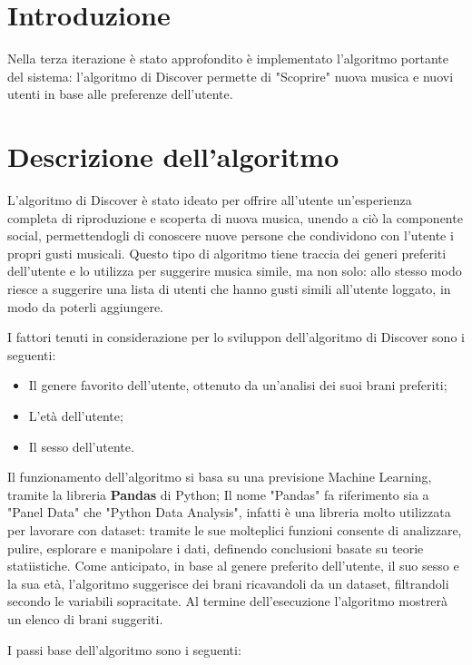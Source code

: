 \section{Introduzione}
Nella terza iterazione è stato approfondito è implementato l'algoritmo portante del sistema: l'algoritmo di Discover permette di "Scoprire" nuova 
musica e nuovi utenti in base alle preferenze dell'utente.


\section{Descrizione dell'algoritmo}
L'algoritmo di Discover è stato ideato per offrire all'utente un'esperienza completa di riproduzione e scoperta di nuova musica, unendo a ciò la 
componente social, permettendogli di conoscere nuove persone che condividono con l'utente i propri gusti musicali. Questo tipo di algoritmo 
tiene traccia dei generi preferiti dell'utente e lo utilizza per suggerire musica simile, ma non solo: allo stesso modo riesce a suggerire 
una lista di utenti che hanno gusti simili all'utente loggato, in modo da poterli aggiungere.  

I fattori tenuti in considerazione per lo sviluppon dell'algoritmo di Discover sono i seguenti: 
\begin{itemize}
    \item Il genere favorito dell'utente, ottenuto da un'analisi dei suoi brani preferiti;
    \item L'età dell'utente;
    \item Il sesso dell'utente.
\end{itemize}


Il funzionamento dell'algoritmo si basa su una previsione Machine Learning, tramite la libreria \textbf{Pandas} di Python;
Il nome "Pandas" fa riferimento sia a "Panel Data" che "Python Data Analysis", infatti è una libreria molto utilizzata per lavorare 
con dataset: tramite le sue molteplici funzioni consente di analizzare, pulire, esplorare e manipolare i dati, definendo 
conclusioni basate su teorie statiistiche. 
Come anticipato, in base al genere preferito dell'utente, il suo sesso e la sua età, l'algoritmo suggerisce dei brani ricavandoli 
da un dataset, filtrandoli secondo le variabili sopracitate. Al termine dell'esecuzione l'algoritmo mostrerà un elenco di brani suggeriti.

I passi base dell'algoritmo sono i seguenti: 

